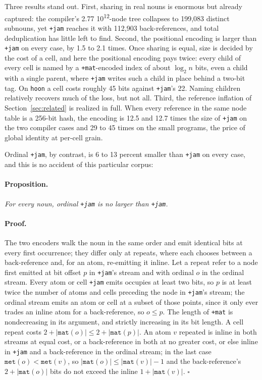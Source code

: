 \documentclass[twoside]{article}
\newcommand{\sci}[2]{#1\,\texttimes\,10\textsuperscript{#2}}
\begin{document}
Three results stand out.  First, sharing in real nouns is enormous but already captured:  the compiler's \sci{2.77}{12}-node tree collapses to 199,083 distinct subnouns, yet \texttt{+jam} reaches it with 112,903 back-references, and total deduplication has little left to find.  Second, the positional encoding is larger than \texttt{+jam} on every case, by 1.5 to 2.1 times.  Once sharing is equal, size is decided by the cost of a cell, and here the positional encoding pays twice:  every child of every cell is named by a \texttt{+mat}-encoded index of about $\log_2 n$ bits, even a child with a single parent, where \texttt{+jam} writes such a child in place behind a two-bit tag.  On \texttt{hoon} a cell costs roughly 45 bits against \texttt{+jam}'s 22.  Naming children relatively recovers much of the loss, but not all.  Third, the reference inflation of Section~\ref{sec:related} is realized in full.  When every reference in the same node table is a 256-bit hash, the encoding is 12.5 and 12.7 times the size of \texttt{+jam} on the two compiler cases and 29 to 45 times on the small programs, the price of global identity at per-cell grain.

Ordinal \texttt{+jam}, by contrast, is 6 to 13 percent smaller than \texttt{+jam} on every case, and this is no accident of this particular corpus:

\paragraph*{Proposition.}
\textit{For every noun, ordinal \textup{\texttt{+jam}} is no larger than \textup{\texttt{+jam}}.}

\paragraph*{Proof.}
The two encoders walk the noun in the same order and emit identical bits at every first occurrence; they differ only at repeats, where each chooses between a back-reference and, for an atom, re-emitting it inline.  Let a repeat refer to a node first emitted at bit offset $p$ in \texttt{+jam}'s stream and with ordinal $o$ in the ordinal stream.  Every atom or cell \texttt{+jam} emits occupies at least two bits, so $p$ is at least twice the number of atoms and cells preceding the node in \texttt{+jam}'s stream; the ordinal stream emits an atom or cell at a subset of those points, since it only ever trades an inline atom for a back-reference, so $o \le p$.  The length of \texttt{+mat} is nondecreasing in its argument, and strictly increasing in its bit length.  A cell repeat costs $2 + |\texttt{mat}(o)| \le 2 + |\texttt{mat}(p)|$.  An atom $v$ repeated is inline in both streams at equal cost, or a back-reference in both at no greater cost, or else inline in \texttt{+jam} and a back-reference in the ordinal stream; in the last case $\texttt{met}(o) < \texttt{met}(v)$, so $|\texttt{mat}(o)| \le |\texttt{mat}(v)| - 1$ and the back-reference's $2 + |\texttt{mat}(o)|$ bits do not exceed the inline $1 + |\texttt{mat}(v)|$. \hfill$\square$
\end{document}
